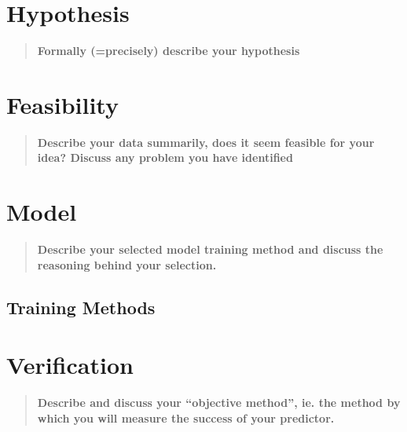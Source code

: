 \documentclass[journal,10pt]{IEEEtran}
\newcommand{\subtask}[1]{\begin{quote}\textbf{#1}\end{quote}}
\begin{document}


\section{Hypothesis}
\subtask{Formally (=precisely) describe your hypothesis}

\section{Feasibility}
\subtask{Describe your data summarily, does it seem feasible for your idea? Discuss any problem you have identified}

\section{Model}
\subtask{Describe your selected model training method and discuss the reasoning behind your selection.}
\subsection{Training Methods}

\section{Verification}
\subtask{Describe and discuss your ``objective method'', ie. the method by which you will measure the success of your predictor.}






\end{document}
